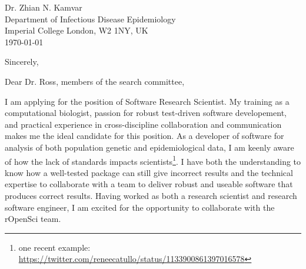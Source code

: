 


\clearpage
\begin{flushright}
  Dr. Zhian N. Kamvar\\
  Department of Infectious Disease Epidemiology\\
  Imperial College London, W2 1NY, UK\\
  \today
\end{flushright}
\closing{Sincerely,} %

Dear Dr. Ross, members of the search committee,

\vspace{1ex}

I am applying for the position of Software Research Scientist. My
training as a computational biologist, passion for robust test-driven software
developement, and practical experience in cross-discipline collaboration and
communication makes me the ideal candidate for this position. As a developer
of software for analysis of both population genetic and epidemiological data, I
am keenly aware of how the lack of standards impacts scientists\footnote{one
recent example:
\url{https://twitter.com/reneecatullo/status/1133900861397016578}}. I have both
the understanding to know how a well-tested package can still give incorrect
results and the technical expertise to collaborate with a team to deliver
robust and useable software that produces correct results. Having worked as
both a research scientist and research software engineer, I am excited for the
opportunity to collaborate with the rOpenSci team. 

\vspace{1ex}

